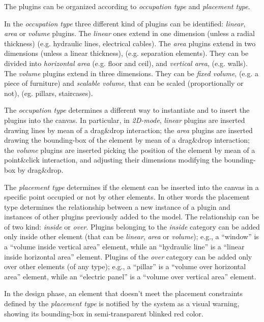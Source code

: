 \noindent
The plugins can be organized according to \emph{occupation type} and \emph{placement type}.

In the \emph{occupation type} three different kind of plugins can be identified: \emph{linear}, \emph{area} or \emph{volume} plugins.
The \emph{linear} ones extend in one dimension (unless a radial thickness) (e.g. hydraulic lines, electrical cables). The \emph{area} plugins extend in two dimensions (unless a linear thickness), (e.g. separation elements). They can be divided into \emph{horizontal area} (e.g. floor and ceil), and \emph{vertical area}, (e.g. walls). The \emph{volume} plugins extend in three dimensions. They can be \emph{fixed volume}, (e.g. a piece of furniture) and \emph{scalable volume}, that can be scaled (proportionally or not), (eg. pillars, staircases).

The \emph{occupation type} determines a different way to instantiate and to insert the plugins into the canvas.
In particular, in \emph{2D-mode}, \emph{linear} plugins are inserted drawing lines by mean of a drag\&drop interaction;
the \emph{area} plugins are inserted drawing the bounding-box of the element by mean of a drag\&drop interaction;
the \emph{volume} plugins are inserted picking the position of the element by mean of a point\&click interaction,
and adjusting their dimensions modifying the bounding-box by drag\&drop.

The \emph{placement type} determines if the element can be inserted into the canvas in a specific point occupied or not by other elements. In other words 
the {placement type} determines the relationship between a new instance of a plugin and instances of other plugins previously added to the model. The relationship can be of two kind: \emph{inside} or \emph{over}.
Plugins belonging to the \emph{inside} category can be added only inside other element (that can be \emph{linear}, \emph{area} or \emph{volume}); e.g., a ``window'' is a ``volume inside vertical area'' element,
while an ``hydraulic line'' is a ``linear inside horizontal area'' element.
Plugins of the \emph{over} category can be added only over other elements (of any type);
e.g., a ``pillar'' is a ``volume over horizontal area'' element,
while an ``electric panel'' is a ``volume over vertical area'' element.

In the design phase, an element that doesn't meet the placement constraints defined by the \emph{placement type} is notified by the system as a visual warning, showing its bounding-box in semi-transparent blinked red color.

